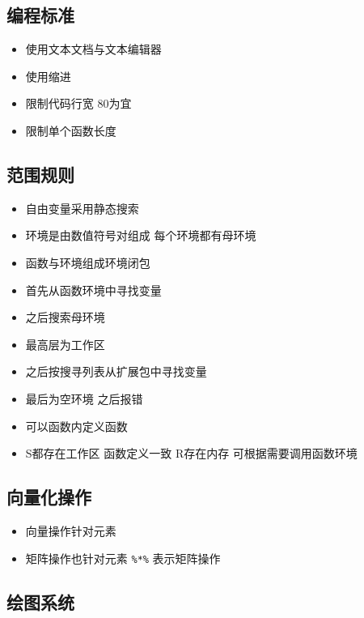 \documentclass[]{book}
\providecommand{\tightlist}{%
  \setlength{\itemsep}{0pt}\setlength{\parskip}{0pt}}
\begin{document}
\hypertarget{ux7f16ux7a0bux6807ux51c6}{%
\subsection{编程标准}\label{ux7f16ux7a0bux6807ux51c6}}

\begin{itemize}
\tightlist
\item
  使用文本文档与文本编辑器
\item
  使用缩进
\item
  限制代码行宽 80为宜
\item
  限制单个函数长度
\end{itemize}

\hypertarget{ux8303ux56f4ux89c4ux5219}{%
\subsection{范围规则}\label{ux8303ux56f4ux89c4ux5219}}

\begin{itemize}
\tightlist
\item
  自由变量采用静态搜索
\item
  环境是由数值符号对组成 每个环境都有母环境
\item
  函数与环境组成环境闭包
\item
  首先从函数环境中寻找变量
\item
  之后搜索母环境
\item
  最高层为工作区
\item
  之后按搜寻列表从扩展包中寻找变量
\item
  最后为空环境 之后报错
\item
  可以函数内定义函数
\item
  S都存在工作区 函数定义一致 R存在内存 可根据需要调用函数环境
\end{itemize}

\hypertarget{ux5411ux91cfux5316ux64cdux4f5c}{%
\subsection{向量化操作}\label{ux5411ux91cfux5316ux64cdux4f5c}}

\begin{itemize}
\tightlist
\item
  向量操作针对元素
\item
  矩阵操作也针对元素 \texttt{\%*\%} 表示矩阵操作
\end{itemize}

\hypertarget{ux7ed8ux56feux7cfbux7edf}{%
\subsection{绘图系统}\label{ux7ed8ux56feux7cfbux7edf}}
\end{document}
